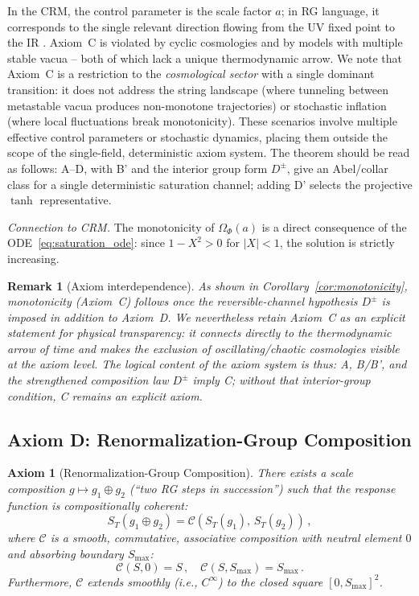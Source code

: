 \documentclass[aps,prd,twocolumn,superscriptaddress,nofootinbib]{revtex4-2}
\newtheorem{remark}{Remark}
\newtheorem{axiom}{Axiom}
\begin{document}
In the CRM, the control parameter is the scale factor $a$; in RG language, it corresponds to the single relevant direction flowing from the UV fixed point to the IR \cite{Percacci2017}. Axiom~C is violated by cyclic cosmologies and by models with multiple stable vacua -- both of which lack a unique thermodynamic arrow. We note that Axiom~C is a restriction to the \textit{cosmological sector} with a single dominant transition: it does not address the string landscape (where tunneling between metastable vacua produces non-monotone trajectories) or stochastic inflation (where local fluctuations break monotonicity). These scenarios involve multiple effective control parameters or stochastic dynamics, placing them outside the scope of the single-field, deterministic axiom system. The theorem should be read as follows: A--D, with B' and the interior group form $D^\pm$, give an Abel/collar class for a single deterministic saturation channel; adding D' selects the projective $\tanh$ representative.

\textit{Connection to CRM.} The monotonicity of $\Omega_\Phi(a)$ is a direct consequence of the ODE~\eqref{eq:saturation_ode}: since $1 - X^2 > 0$ for $|X| < 1$, the solution is strictly increasing.

\begin{remark}[Axiom interdependence]
As shown in Corollary~\ref{cor:monotonicity}, monotonicity (Axiom~C) follows once the reversible-channel hypothesis $D^\pm$ is imposed in addition to Axiom~D. We nevertheless retain Axiom~C as an explicit statement for physical transparency: it connects directly to the thermodynamic arrow of time and makes the exclusion of oscillating/chaotic cosmologies visible at the axiom level. The logical content of the axiom system is thus: A, B/B', and the strengthened composition law $D^\pm$ imply C; without that interior-group condition, C remains an explicit axiom.
\end{remark}

\subsection{Axiom D: Renormalization-Group Composition}

\begin{axiom}[Renormalization-Group Composition]
\label{ax:composition}
There exists a scale composition $g \mapsto g_1 \oplus g_2$ (``two RG steps in succession'') such that the response function is compositionally coherent:
\begin{equation}
S_T(g_1 \oplus g_2) = \mathcal{C}\!\left(S_T(g_1),\, S_T(g_2)\right)\,,
\label{eq:composition}
\end{equation}
where $\mathcal{C}$ is a smooth, commutative, associative composition with neutral element $0$ and absorbing boundary $S_{\max}$:
\begin{equation}
\mathcal{C}(S, 0) = S\,, \quad \mathcal{C}(S, S_{\max}) = S_{\max}\,.
\label{eq:composition_boundary}
\end{equation}
Furthermore, $\mathcal{C}$ extends smoothly (i.e., $C^\infty$) to the closed square $[0, S_{\max}]^2$.
\end{axiom}
\end{document}
